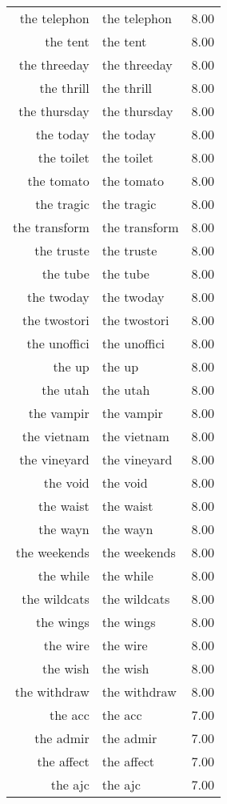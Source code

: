 \begin{table}[ht]
\begin{tabular}{rlr}
  the telephon & the telephon & 8.00 \\ 
  the tent & the tent & 8.00 \\ 
  the threeday & the threeday & 8.00 \\ 
  the thrill & the thrill & 8.00 \\ 
  the thursday & the thursday & 8.00 \\ 
  the today & the today & 8.00 \\ 
  the toilet & the toilet & 8.00 \\ 
  the tomato & the tomato & 8.00 \\ 
  the tragic & the tragic & 8.00 \\ 
  the transform & the transform & 8.00 \\ 
  the truste & the truste & 8.00 \\ 
  the tube & the tube & 8.00 \\ 
  the twoday & the twoday & 8.00 \\ 
  the twostori & the twostori & 8.00 \\ 
  the unoffici & the unoffici & 8.00 \\ 
  the up & the up & 8.00 \\ 
  the utah & the utah & 8.00 \\ 
  the vampir & the vampir & 8.00 \\ 
  the vietnam & the vietnam & 8.00 \\ 
  the vineyard & the vineyard & 8.00 \\ 
  the void & the void & 8.00 \\ 
  the waist & the waist & 8.00 \\ 
  the wayn & the wayn & 8.00 \\ 
  the weekends & the weekends & 8.00 \\ 
  the while & the while & 8.00 \\ 
  the wildcats & the wildcats & 8.00 \\ 
  the wings & the wings & 8.00 \\ 
  the wire & the wire & 8.00 \\ 
  the wish & the wish & 8.00 \\ 
  the withdraw & the withdraw & 8.00 \\ 
  the acc & the acc & 7.00 \\ 
  the admir & the admir & 7.00 \\ 
  the affect & the affect & 7.00 \\ 
  the ajc & the ajc & 7.00 \\ 

\end{tabular}
\end{table}
